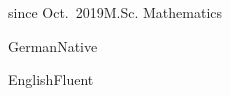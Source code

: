 \documentclass[a4paper,10pt]{cv}
\begin{document}
      \begin{cvTimeItem}{since Oct.~2019}{M.Sc. Mathematics}
      \end{cvTimeItem}

      \vspace{-1.8em}
      \begin{multicols}{2}
        \begin{cvSkillItem}{German}{Native}
        \end{cvSkillItem}
        \begin{cvSkillItem}{English}{Fluent}
        \end{cvSkillItem}
      \end{multicols}
\end{document}
